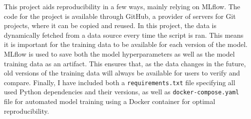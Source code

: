 This project aids reproducibility in a few ways, mainly relying on MLflow. The code for the project is available through GitHub, a provider of servers for Git projects, where it can be copied and reused. In this project, the data is dynamically fetched from a data source every time the script is ran. This means it is important for the training data to be available for each version of the model. MLflow is used to save both the model hyperparameters as well as the model training data as an artifact. This ensures that, as the data changes in the future, old versions of the training data will always be available for users to verify and compare. Finally, I have included both a \texttt{requirements.txt} file specifying all used Python dependencies and their versions, as well as \texttt{docker-compose.yaml} file for automated model training using a Docker container for optimal reproducibility.
